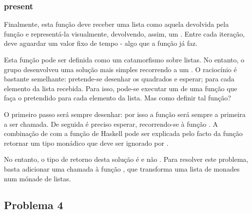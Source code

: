 \documentclass[a4paper]{article}
\begin{document}
\subsubsection*{present}


Finalmente, esta função deve receber uma lista como aquela devolvida pela função  e representá-la visualmente, devolvendo, assim, um . Entre cada iteração, deve aguardar um valor fixo de tempo - algo que a função  já faz.

Esta função pode ser definida como um catamorfismo sobre listas. No entanto, o grupo desenvolveu uma solução mais simples recorrendo a um . O raciocínio é bastante semelhante: pretende-se desenhar os quadrados e esperar; para cada elemento da lista recebida. Para isso, pode-se executar um  de uma função que faça o pretendido para cada elemento da lista. Mas como definir tal função? 

O primeiro passo será sempre desenhar: por isso a função  será sempre a primeira a ser chamada. De seguida é preciso esperar, recorrendo-se à função . A combinação de  com a função  de Haskell pode ser explicada pelo facto da função  retornar um tipo monádico que deve ser ignorado por .

No entanto, o tipo de retorno desta solução é  e não . Para resolver este problema, basta adicionar uma chamada à função , que transforma uma lista de monades num mónade de listas.



\subsection*{Problema 4}
\end{document}
